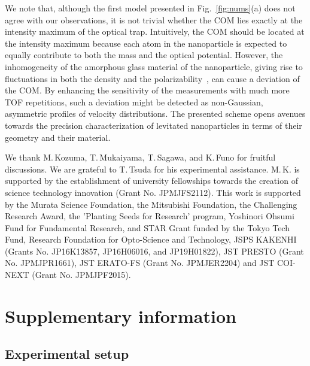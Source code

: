 \documentclass[aps, prl, 
amsmath, showpacs, preprintnumbers, twocolumn, amssymb, amsmath, superscriptaddress]{revtex4-1}
\begin{document}
We note that, although the first model presented in Fig.~\ref{fig:nums}(a) does not agree with our observations, it is not trivial whether the COM lies exactly at the intensity maximum of the optical trap. Intuitively, the COM should be located at the intensity maximum because each atom in the nanoparticle is expected to equally contribute to both the mass and the optical potential. However, the inhomogeneity of the amorphous glass material of the nanoparticle, giving rise to fluctuations in both the density and the polarizability~\cite{revesz1972pressure,kakiuchida2004refractive}, can cause a deviation of the COM. By enhancing the sensitivity of the measurements with much more TOF repetitions, such a deviation might be detected as non-Gaussian, asymmetric profiles of velocity distributions. The presented scheme opens avenues towards the precision characterization of levitated nanoparticles in terms of their geometry and their material.
 



\begin{acknowledgments}
We thank M.\,Kozuma, T.\,Mukaiyama, T.\,Sagawa, and K.\,Funo for fruitful discussions. We are grateful to T.\,Tsuda for his experimental assistance. M.\,K. is supported by  the establishment of university fellowships towards the creation of science technology innovation (Grant No. JPMJFS2112). This work is supported by the Murata Science Foundation, the Mitsubishi Foundation, the Challenging Research Award, the 'Planting Seeds for Research' program, Yoshinori Ohsumi Fund for Fundamental Research, and STAR Grant funded by the Tokyo Tech Fund, Research Foundation for Opto-Science and Technology, JSPS KAKENHI (Grants No. JP16K13857, JP16H06016, and JP19H01822), JST PRESTO (Grant No. JPMJPR1661), JST ERATO-FS (Grant No. JPMJER2204) and JST COI-NEXT (Grant No. JPMJPF2015).
\end{acknowledgments}



\section{Supplementary information}
\subsection{Experimental setup}
\end{document}
